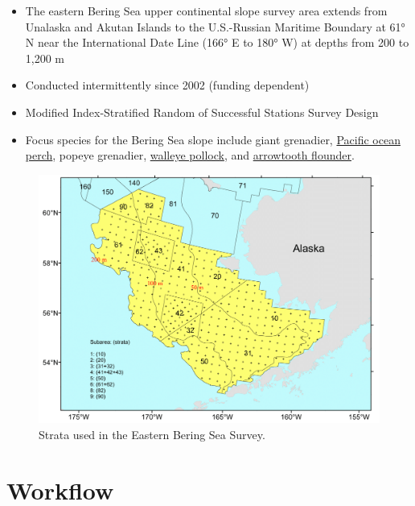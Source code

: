 \documentclass[
  letterpaper,
  oneside,
  open=any]{scrbook}
\providecommand{\tightlist}{%
  \setlength{\itemsep}{0pt}\setlength{\parskip}{0pt}}\usepackage{longtable,booktabs,array}
\begin{document}
\begin{itemize}
\tightlist
\item
  The eastern Bering Sea upper continental slope survey area extends
  from Unalaska and Akutan Islands to the U.S.-Russian Maritime Boundary
  at 61° N near the International Date Line (166° E to 180° W) at depths
  from 200 to 1,200 m
\item
  Conducted intermittently since 2002 (funding dependent)
\item
  Modified Index-Stratified Random of Successful Stations Survey Design
\item
  Focus species for the Bering Sea slope include giant grenadier,
  \href{https://www.fisheries.noaa.gov/species/pacific-ocean-perch}{Pacific
  ocean perch}, popeye grenadier,
  \href{https://www.fisheries.noaa.gov/species/alaska-pollock}{walleye
  pollock}, and
  \href{https://www.fisheries.noaa.gov/species/arrowtooth-flounder}{arrowtooth
  flounder}.
\end{itemize}

\begin{figure}

{\centering \includegraphics[width=7.19in,height=\textheight]{content/../img/ebs-strata.png}

}

\caption{Strata used in the Eastern Bering Sea Survey.}

\end{figure}

\hypertarget{workflow}{%
\chapter{Workflow}\label{workflow}}
\end{document}
